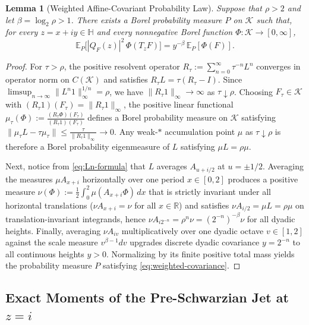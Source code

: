 \documentclass[12pt]{article}
\def\R{\mathbb{R}}
\def\H{\mathbb{H}}
\def\K{\mathcal{K}}
\def\E{\mathbb{E}}
\newtheorem{lemma}[thm]{Lemma}
\theoremstyle{definition}
\numberwithin{equation}{section}
\begin{document}
\begin{lemma}[Weighted Affine-Covariant Probability Law]\label{lem:weighted-covariance}
Suppose that $\rho > 2$ and let $\beta = \log_2 \rho > 1$. There exists a Borel probability measure $P$ on $\K$ such that, for every $z = x+iy \in \H$ and every nonnegative Borel function $\Phi : \K \to [0, \infty]$,
\begin{equation}\label{eq:weighted-covariance}
  \E_P\Big[|Q_F(z)|^2 \, \Phi(T_z F)\Big] = y^{-\beta} \, \E_P[\Phi(F)].
\end{equation}
\end{lemma}

\begin{proof}
For $\tau > \rho$, the positive resolvent operator $R_\tau := \sum_{n=0}^{\infty} \tau^{-n} L^n$ converges in operator norm on $C(\K)$ and satisfies $R_\tau L = \tau(R_\tau - I)$. Since $\limsup_{n\to\infty} \|L^n 1\|_\infty^{1/n} = \rho$, we have $\|R_\tau 1\|_\infty \to \infty$ as $\tau \downarrow \rho$. Choosing $F_\tau \in \K$ with $(R_\tau 1)(F_\tau) = \|R_\tau 1\|_\infty$, the positive linear functional $\mu_\tau(\Phi) := \frac{(R_\tau \Phi)(F_\tau)}{(R_\tau 1)(F_\tau)}$ defines a Borel probability measure on $\K$ satisfying $\|\mu_\tau L - \tau \mu_\tau\| \le \frac{\tau}{\|R_\tau 1\|_\infty} \to 0$. Any weak-$*$ accumulation point $\mu$ as $\tau \downarrow \rho$ is therefore a Borel probability eigenmeasure of $L$ satisfying $\mu L = \rho \mu$.

Next, notice from \eqref{eq:Ln-formula} that $L$ averages $A_{u + i/2}$ at $u = \pm 1/2$. Averaging the measures $\mu A_{x+i}$ horizontally over one period $x \in [0, 2]$ produces a positive measure $\nu(\Phi) := \frac{1}{2}\int_0^2 \mu(A_{x+i}\Phi)\, dx$ that is strictly invariant under all horizontal translations ($\nu A_{x+i} = \nu$ for all $x \in \R$) and satisfies $\nu A_{i/2} = \mu L = \rho \mu$ on translation-invariant integrands, hence $\nu A_{i 2^{-n}} = \rho^n \nu = (2^{-n})^{-\beta}\nu$ for all dyadic heights. Finally, averaging $\nu A_{iv}$ multiplicatively over one dyadic octave $v \in [1, 2]$ against the scale measure $v^{\beta - 1} dv$ upgrades discrete dyadic covariance $y = 2^{-n}$ to all continuous heights $y > 0$. Normalizing by its finite positive total mass yields the probability measure $P$ satisfying \eqref{eq:weighted-covariance}.
\end{proof}

\subsection{Exact Moments of the Pre-Schwarzian Jet at $z = i$}
\end{document}
